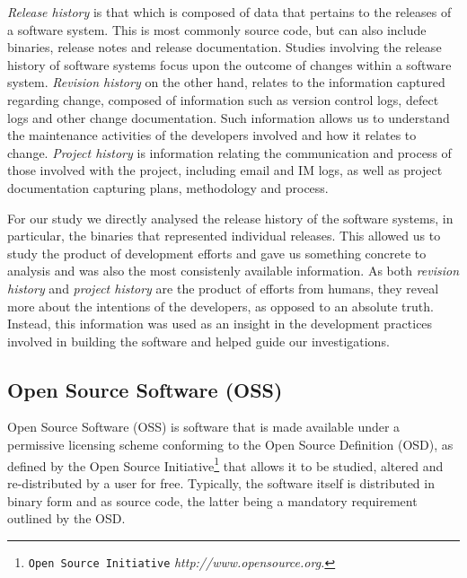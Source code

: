 \emph{Release history} is that which is composed of data that pertains to the releases of a software system. This is most commonly source code, but can also include binaries, release notes and release documentation. Studies involving the release history of software systems focus upon the outcome of changes within a software system. \emph{Revision history} on the other hand, relates to the information captured regarding change, composed of information such as version control logs, defect logs and other change documentation. Such information allows us to understand the maintenance activities of the developers involved and how it relates to change. \emph{Project history} is information relating the communication and process of those involved with the project, including email and IM logs, as well as project documentation capturing plans, methodology and process.

For our study we directly analysed the release history of the software systems, in particular, the binaries that represented individual releases. This allowed us to study the product of development efforts and gave us something concrete to analysis and was also the most consistenly available information. As both \emph{revision history} and \emph{project history} are the product of efforts from humans, they reveal more about the intentions of the developers, as opposed to an absolute truth. Instead, this information was used as an insight in the development practices involved in building the software and helped guide our investigations.


\subsection{Open Source Software (OSS)} %
\label{sub:open_source_software_oss_}

Open Source Software (OSS) is software that is made available under a permissive licensing scheme conforming to the Open Source Definition (OSD), as defined by the Open Source Initiative\footnote{\texttt{Open Source Initiative} \emph{http://www.opensource.org.}} that allows it to be studied, altered and re-distributed by a user for free. Typically, the software itself is distributed in binary form and as source code, the latter being a mandatory requirement outlined by the OSD.

